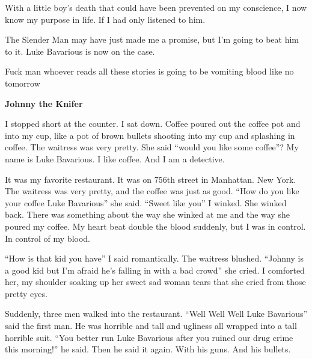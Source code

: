 With a little boy's death that could have been prevented on
my conscience, I now know my purpose in life. If I had only
listened to him.



The Slender Man may have just made me a promise, but I'm
going to beat him to it. Luke Bavarious is now on the case. 

 





Fuck man whoever reads all these stories is going to be vomiting
blood like no tomorrow 
 





{\bf Johnny the Knifer}



I stopped short at the counter. I sat down. Coffee poured out the
coffee pot and into my cup, like a pot of brown bullets shooting
into my cup and splashing in coffee. The waitress was very pretty.
She said ``would you like some coffee''? My name is Luke Bavarious. I
like coffee. And I am a detective.



It was my favorite restaurant. It was on 756th street in Manhattan.
New York. The waitress was very pretty, and the coffee was just as
good. ``How do you like your coffee Luke Bavarious'' she said. ``Sweet
like you'' I winked. She winked back. There was something about the
way she winked at me and the way she poured my coffee. My heart
beat double the blood suddenly, but I was in control. In control of
my blood.



``How is that kid you have'' I said romantically. The waitress
blushed. ``Johnny is a good kid but I'm afraid he's falling in with
a bad crowd'' she cried. I comforted her, my shoulder soaking up her
sweet sad woman tears that she cried from those pretty eyes.



Suddenly, three men walked into the restaurant. ``Well Well Well
Luke Bavarious'' said the first man. He was horrible and tall and
ugliness all wrapped into a tall horrible suit. ``You better run
Luke Bavarious after you ruined our drug crime this morning!'' he
said. Then he said it again. With his guns. And his bullets.



